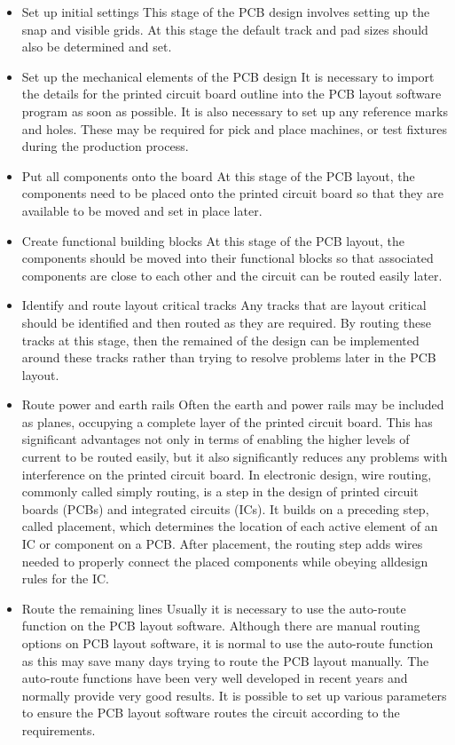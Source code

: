\documentclass[12pt]{article}
\begin{document}
\begin{itemize}


\item	Set up initial settings 
This stage of the PCB design involves setting up the snap and visible grids. At this stage the default track and pad sizes should also be determined and set.
\item	Set up the mechanical elements of the PCB design 
It is necessary to import the details for the printed circuit board outline into the PCB layout software program as soon as possible. It is also necessary to set up any reference marks and holes. These may be required for pick and place machines, or test fixtures during the production process.
\item	Put all components onto the board   
At this stage of the PCB layout, the components need to be placed onto the printed circuit board so that they are available to be moved and set in place later.
\item	Create functional building blocks 
 At this stage of the PCB layout, the components should be moved into their functional blocks so that associated components are close to each other and the circuit can be routed easily later.
\item	Identify and route layout critical tracks   
Any tracks that are layout critical should be identified and then routed as they are required. By routing these tracks at this stage, then the remained of the design can be implemented around these tracks rather than trying to resolve problems later in the PCB layout.
\item Route power and earth rails   
Often the earth and power rails may be included as planes, occupying a complete layer of the printed circuit board. This has significant advantages not only in terms of enabling the higher levels of current to be routed easily, but it also significantly reduces any problems with interference on the printed circuit board. In electronic design, wire routing, commonly called simply routing, is a step in the design of printed circuit boards (PCBs) and integrated circuits (ICs). It builds on a preceding step, called placement, which determines the location of each active element of an IC or component on a PCB. After placement, the routing step adds wires needed to properly connect the placed components while obeying alldesign rules for the IC.
\item	Route the remaining lines
 Usually it is necessary to use the auto-route function on the PCB layout software. Although there are manual routing options on PCB layout software, it is normal to use the auto-route function as this may save many days trying to route the PCB layout manually. The auto-route functions have been very well developed in recent years and normally provide very good results. It is possible to set up various parameters to ensure the PCB layout software routes the circuit according to the requirements.

\end{itemize}
\end{document}
